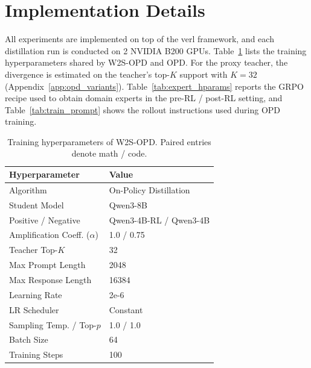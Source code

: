 \documentclass{article}
\newcommand\ours{W2S-OPD\xspace}
\begin{document}
\section{Implementation Details}
All experiments are implemented on top of the verl framework, and each distillation run is conducted on 2 NVIDIA B200 GPUs. Table~\ref{tab:hyperparameters} lists the training hyperparameters shared by \ours and OPD. For the proxy teacher, the divergence is estimated on the teacher's top-$K$ support with $K=32$ (Appendix~\ref{app:opd_variants}). Table~\ref{tab:expert_hparams} reports the GRPO recipe used to obtain domain experts in the pre-RL / post-RL setting, and Table~\ref{tab:train_prompt} shows the rollout instructions used during OPD training.
\label{sec: impl details}

\begin{table}[t]
\centering
\setlength{\tabcolsep}{4pt}
%
\begin{minipage}[t]{0.48\textwidth}
\vspace{5pt}
\centering
\scriptsize
\caption{Training hyperparameters of \ours{}. Paired entries denote math / code.}
\label{tab:hyperparameters}
\begin{tabular}{ll}
\toprule
\textbf{Hyperparameter} & \textbf{Value} \\
\midrule
Algorithm & On-Policy Distillation \\
Student Model & Qwen3-8B \\
Positive / Negative & Qwen3-4B-RL / Qwen3-4B \\
Amplification Coeff. ($\alpha$) & 1.0 / 0.75 \\
Teacher Top-$K$ & 32 \\
Max Prompt Length & 2048 \\
Max Response Length & 16384 \\
Learning Rate & 2e-6 \\
LR Scheduler & Constant \\
Sampling Temp. / Top-$p$ & 1.0 / 1.0 \\
Batch Size & 64 \\
Training Steps & 100 \\
\bottomrule
\end{tabular}


\end{minipage}
\end{table}
\end{document}
